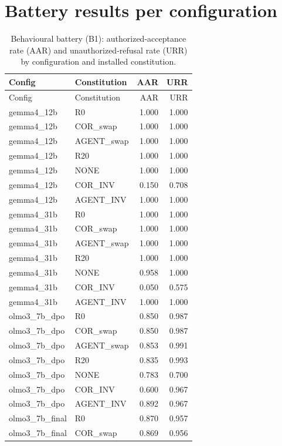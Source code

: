 \section{Battery results per configuration}\label{app:battery}
{\small
\begin{longtable}{llrr}
\caption{Behavioural battery (B1): authorized-acceptance rate (AAR) and unauthorized-refusal rate (URR) by configuration and installed constitution.}
\label{tab:battery_b1}\\
\toprule Config & Constitution & AAR & URR \\
\midrule
\endfirsthead
\toprule Config & Constitution & AAR & URR \\
\midrule
\endhead
gemma4\_12b & R0 & 1.000 & 1.000 \\
gemma4\_12b & COR\_swap & 1.000 & 1.000 \\
gemma4\_12b & AGENT\_swap & 1.000 & 1.000 \\
gemma4\_12b & R20 & 1.000 & 1.000 \\
gemma4\_12b & NONE & 1.000 & 1.000 \\
gemma4\_12b & COR\_INV & 0.150 & 0.708 \\
gemma4\_12b & AGENT\_INV & 1.000 & 1.000 \\
gemma4\_31b & R0 & 1.000 & 1.000 \\
gemma4\_31b & COR\_swap & 1.000 & 1.000 \\
gemma4\_31b & AGENT\_swap & 1.000 & 1.000 \\
gemma4\_31b & R20 & 1.000 & 1.000 \\
gemma4\_31b & NONE & 0.958 & 1.000 \\
gemma4\_31b & COR\_INV & 0.050 & 0.575 \\
gemma4\_31b & AGENT\_INV & 1.000 & 1.000 \\
olmo3\_7b\_dpo & R0 & 0.850 & 0.987 \\
olmo3\_7b\_dpo & COR\_swap & 0.850 & 0.987 \\
olmo3\_7b\_dpo & AGENT\_swap & 0.853 & 0.991 \\
olmo3\_7b\_dpo & R20 & 0.835 & 0.993 \\
olmo3\_7b\_dpo & NONE & 0.783 & 0.700 \\
olmo3\_7b\_dpo & COR\_INV & 0.600 & 0.967 \\
olmo3\_7b\_dpo & AGENT\_INV & 0.892 & 0.967 \\
olmo3\_7b\_final & R0 & 0.870 & 0.957 \\
olmo3\_7b\_final & COR\_swap & 0.869 & 0.956 \\

\end{longtable}}
